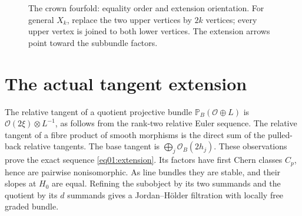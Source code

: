 \documentclass[11pt]{amsart}
\theoremstyle{definition}
\theoremstyle{remark}
\newcommand{\PP}{\mathbb P}
\newcommand{\cO}{\mathcal O}
\begin{document}
\begin{figure}[htbp]
\centering
{}
\caption{The crown fourfold: equality order and extension orientation.
For general \(X_k\), replace the two upper vertices by \(2k\)
vertices; every upper vertex is joined to both lower vertices.
The extension arrows point toward the subbundle factors.}
\label{fig06:poset}
\end{figure}


\section{The actual tangent extension}\label{sec07:extension}

The relative tangent of a quotient projective bundle
\(\PP_B(\cO\oplus L)\) is \(\cO(2\xi)\otimes L^{-1}\),
as follows from the rank-two relative Euler sequence. The relative
tangent of a fibre product of smooth morphisms is the direct sum of
the pulled-back relative tangents. The base tangent is
\(\bigoplus_j\cO_B(2h_j)\). These observations prove the exact
sequence \eqref{eq01:extension}. Its factors have first Chern
classes \(C_p\), hence are pairwise nonisomorphic. As line bundles
they are stable, and their slopes at \(H_0\) are equal. Refining
the subobject by its two summands and the quotient by its \(d\)
summands gives a Jordan--H\"older filtration with locally free
graded bundle.
\end{document}
